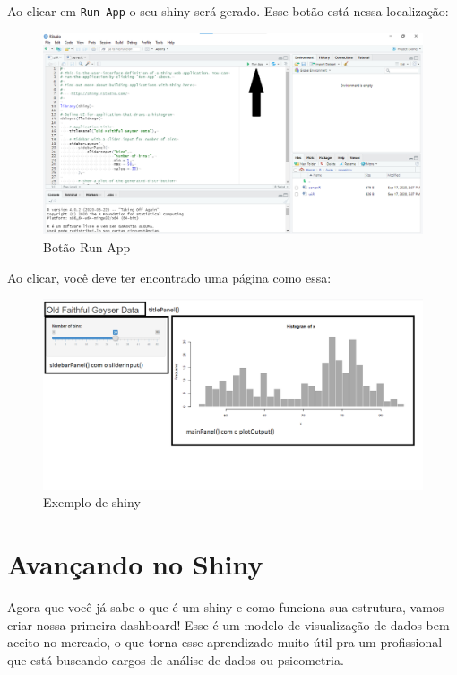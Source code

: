 \documentclass[
]{book}
\begin{document}
Ao clicar em \texttt{Run\ App} o seu shiny será gerado. Esse botão está nessa localização:

\begin{figure}
\centering
\includegraphics{./imagens/cap10imagem4.png}
\caption{Botão Run App}
\end{figure}

Ao clicar, você deve ter encontrado uma página como essa:

\begin{figure}
\centering
\includegraphics{./imagens/cap10imagem5.png}
\caption{Exemplo de shiny}
\end{figure}

\hypertarget{shiny2}{%
\chapter{Avançando no Shiny}\label{shiny2}}

Agora que você já sabe o que é um shiny e como funciona sua estrutura, vamos criar nossa primeira dashboard! Esse é um modelo de visualização de dados bem aceito no mercado, o que torna esse aprendizado muito útil pra um profissional que está buscando cargos de análise de dados ou psicometria.
\end{document}
